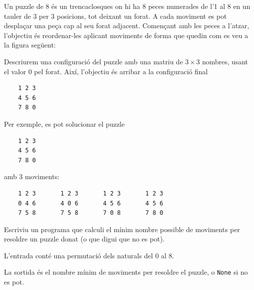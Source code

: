 

\Statement

Un puzzle de 8 és un trencaclosques on hi ha 8 peces numerades de l'1 al 8 en un tauler de 3 per 3 posicions, tot deixant un forat. A cada moviment es pot desplaçar una peça cap al seu forat adjacent. Començant amb les peces a l'atzar, l'objectiu és reordenar-les aplicant moviments de forma que quedin com es veu a la figura següent:


Descriurem una configuració del puzzle amb una matriu de $3\times3$ nombres, usant el valor 0 pel forat. Així, l'objectiu és arribar a la configuració final

\begin{verbatim}
    1 2 3
    4 5 6 
    7 8 0
\end{verbatim}

\medskip

Per exemple, es pot solucionar el puzzle 

\begin{verbatim}
    1 2 3
    4 5 6 
    7 8 0
\end{verbatim}

amb 3 moviments:

\begin{verbatim}    
    1 2 3       1 2 3       1 2 3       1 2 3
    0 4 6       4 0 6       4 5 6       4 5 6
    7 5 8       7 5 8       7 0 8       7 8 0
\end{verbatim}

\medskip

Escriviu un programa que calculi el mínim nombre possible de moviments per resoldre un puzzle donat (o que digui que no es pot).

\Input

L'entrada conté una permutació dels naturals del 0 al 8.

\Output

La sortida és el nombre mínim de moviments per resoldre el puzzle, o \texttt{None} si no es pot.


\Sample

